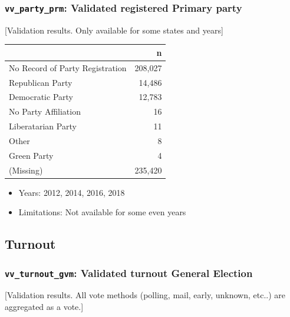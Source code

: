\documentclass[10pt,article,oneside]{memoir}
\theoremstyle{definition}
\begin{document}
\hypertarget{vv_party_prm-validated-registered-primary-party}{%
\subsubsection{\texorpdfstring{\texttt{vv\_party\_prm}: Validated
registered Primary
party}{vv\_party\_prm: Validated registered Primary party}}\label{vv_party_prm-validated-registered-primary-party}}

{[}Validation results. Only available for some states and years{]}

\begin{table}[H]
\centering
\begin{tabular}{lr}
\toprule
 & n\\
\midrule
No Record of Party Registration & 208,027\\
Republican Party & 14,486\\
Democratic Party & 12,783\\
No Party Affiliation & 16\\
Liberatarian Party & 11\\
Other & 8\\
Green Party & 4\\
(Missing) & 235,420\\
\bottomrule
\end{tabular}
\end{table}

\begin{itemize}
\tightlist
\item
  Years: 2012, 2014, 2016, 2018
\item
  Limitations: Not available for some even years
\end{itemize}

\hypertarget{turnout}{%
\subsection{Turnout}\label{turnout}}

\hypertarget{vv_turnout_gvm-validated-turnout-general-election}{%
\subsubsection{\texorpdfstring{\texttt{vv\_turnout\_gvm}: Validated
turnout General
Election}{vv\_turnout\_gvm: Validated turnout General Election}}\label{vv_turnout_gvm-validated-turnout-general-election}}

{[}Validation results. All vote methods (polling, mail, early, unknown,
etc..) are aggregated as a vote.{]}
\end{document}

